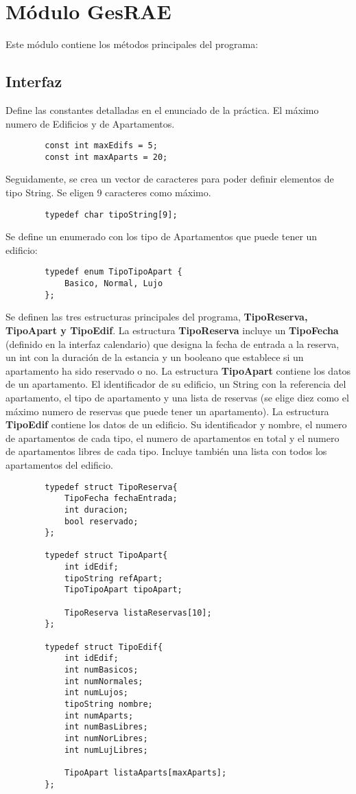 \documentclass[12pt]{article}
\begin{document}
	
	\section{\textbf{Módulo GesRAE}}
	Este módulo contiene los métodos principales del programa:
	
	\subsection{Interfaz}
	
	Define las constantes detalladas en el enunciado de la práctica. El  máximo numero de Edificios y de Apartamentos.
	
	\begin{lstlisting}
		const int maxEdifs = 5;
		const int maxAparts = 20;
	\end{lstlisting}
	
	Seguidamente, se crea un vector de caracteres para poder definir elementos de tipo String. Se eligen 9 caracteres como máximo.
	
	\begin{lstlisting}
		typedef char tipoString[9];
	\end{lstlisting}
	
	Se define un enumerado con los tipo de Apartamentos que puede tener un edificio:
	
	\begin{lstlisting}
		typedef enum TipoTipoApart {
			Basico, Normal, Lujo
		};
	\end{lstlisting}
	
	Se definen las tres estructuras principales del programa, \textbf{TipoReserva, TipoApart y TipoEdif}. 
	La estructura \textbf{TipoReserva} incluye un \textbf{TipoFecha} (definido en la interfaz calendario) que designa la fecha de entrada a la reserva, un int con la duración de la estancia y un booleano que establece si un apartamento ha sido reservado o no.
	La estructura \textbf{TipoApart} contiene los datos de un apartamento. El identificador de su edificio, un String con la referencia del apartamento, el tipo de apartamento y una lista de reservas (se elige diez como el máximo numero de reservas que puede tener un apartamento).
	La estructura \textbf{TipoEdif} contiene los datos de un edificio. Su identificador y nombre, el numero de apartamentos de cada tipo, el numero de apartamentos en total y el numero de apartamentos libres de cada tipo. Incluye también una lista con todos los apartamentos del edificio.
	
	\begin{lstlisting}
		typedef struct TipoReserva{
			TipoFecha fechaEntrada;
			int duracion;
			bool reservado;
		};
		
		typedef struct TipoApart{
			int idEdif;
			tipoString refApart;
			TipoTipoApart tipoApart;
			
			TipoReserva listaReservas[10];
		};
		
		typedef struct TipoEdif{
			int idEdif;
			int numBasicos;
			int numNormales;
			int numLujos;
			tipoString nombre;
			int numAparts;
			int numBasLibres;
			int numNorLibres;
			int numLujLibres;
			
			TipoApart listaAparts[maxAparts];
		};
	\end{lstlisting}
	
\end{document}
